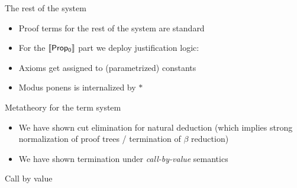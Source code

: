 \documentclass{beamer}
\begin{document}
  \begin{frame}{The rest of the system}
    \begin{itemize}
    \item[] Proof terms for the rest of the system are standard
    \item[] For the ${\sf \llbracket Prop_0\rrbracket}$ part we deploy justification logic:
    \item[] Axioms get assigned to (parametrized) constants
    \item[] Modus ponens is internalized by $*$
  \end{itemize}
\end{frame}
\begin{frame}{Metatheory for the term system}
  \begin {itemize}
    \item  We have shown cut elimination for natural deduction (which implies strong normalization of proof trees / termination of $\beta$ reduction)
    \item  We have shown termination under \textit{call-by-value} semantics 
    
\end{itemize}
\end{frame}
\begin{frame}{Call by value}
\end{frame}
\end{document}
